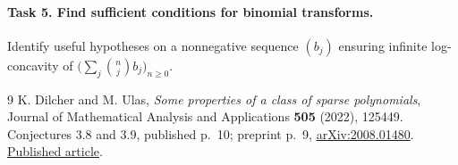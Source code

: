\documentclass[11pt]{article}
\begin{document}
\paragraph{Task 5. Find sufficient conditions for binomial transforms.}
Identify useful hypotheses on a nonnegative sequence $(b_j)$ ensuring
infinite log-concavity of $\bigl(\sum_j\binom nj b_j\bigr)_{n\geq0}$.

\begin{thebibliography}{9}
K. Dilcher and M. Ulas, \emph{Some properties of a class of sparse
polynomials}, Journal of Mathematical Analysis and Applications
\textbf{505} (2022), 125449.
Conjectures 3.8 and 3.9, published p.~10; preprint p.~9,
\href{https://arxiv.org/abs/2008.01480}{arXiv:2008.01480}.
\href{https://doi.org/10.1016/j.jmaa.2021.125449}{Published article}.
\end{thebibliography}
\end{document}
